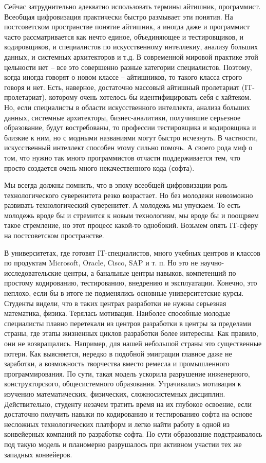 \begin{partbacktext}
Сейчас затруднительно адекватно использовать термины айтишник, программист. Всеобщая цифровизация практически быстро размывает эти понятия. На постсоветском пространстве понятие айтишник, а иногда даже и программист часто рассматривается как нечто единое, объединяющее и тестировщиков, и кодировщиков, и специалистов по искусственному интеллекиу, анализу больших данных, и системных архитекторов и т.д. В современной мировой практике этой цельности нет -- все это совершенно разные категории специалистов. Поэтому, когда иногда говорят о новом классе -- айтишников, то такого класса строго говоря и нет. Есть, наверное, достаточно массовый айтишный пролетариат (IT-пролетариат), которому очень хотелось бы идентифицировать себя с хайтеком. Но, если специалисты в области искусственного интеллекта, анализа больших данных, системные архитекторы, бизнес-аналитики, получившие серьезное образование, будут востребованы, то профессии тестировщика и кодировщика и близкие к ним, но с модными названиями могут быстро исчезнуть. В частности, искусственный интеллект способен этому сильно помочь. А своего рода миф о том, что нужно так много программистов отчасти поддерживается тем, что просто создается очень много некачественного кода (софта).

Мы всегда должны помнить, что в эпоху всеобщей цифровизации роль технологического суверенитета резко возрастает. Но без молодежи невозможно развивать технологический суверенитет. А молодежь мы упускаем. То есть молодежь вроде бы и стремится к новым технологиям, мы вроде бы и поощряем такое стремление, но этот процесс какой-то однобокий. Возьмем опять IT-сферу на постсоветском пространстве.

В университетах, где готовят IT-специалистов, много учебных центров и классов по продуктам Microsoft, Oracle, Cisco, SAP и т. п. Но это не научно-исследовательские центры, а банальные центры навыков, компетенций по простому кодированию, тестированию, внедрению и эксплуатации. Конечно, это неплохо, если бы в итоге не подменялись основные университетские курсы. Студенты видели, что в таких центрах разработки не нужны серьезная математика, физика. Терялась мотивация. Наиболее способные молодые специалисты плавно перетекали из центров разработки в центры за пределами страны, где этапы жизненных циклов разработки более интересны. Как правило, они не возвращались. Например, для нашей небольшой страны это существенные потери. Как выясняется, нередко в подобной эмиграции главное даже не заработки, а возможность творчества вместо ремесла и промышленного программирования. По сути, такая модель ускорила разрушение инженерного, конструкторского, общесистемного образования. Утрачивалась мотивация к изучению математических, физических, сложносистемных дисциплин. Действительно, студенту незачем тратить время на их глубокое освоение, если достаточно получить навыки по кодированию и тестированию софта на основе несложных технологических платформ и легко найти работу в одной из конвейерных компаний по разработке софта. По сути образование подстраивалось под такую модель и планомерно разрушалось при активном участии тех же западных конвейеров.


\end{partbacktext}
